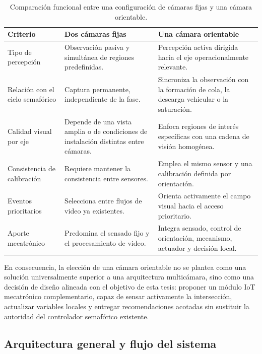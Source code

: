 \begin{table}[H]
  \centering
  \footnotesize
  \caption{Comparación funcional entre una configuración de cámaras fijas y una cámara orientable.}
  \label{tab:camara-orientable}
  \begin{tabularx}{\linewidth}{@{}>{\raggedright\arraybackslash}p{3.0cm}XX@{}}
    \toprule
    \textbf{Criterio} & \textbf{Dos cámaras fijas} & \textbf{Una cámara orientable}\\
    \midrule
    Tipo de percepción & Observación pasiva y simultánea de regiones predefinidas. & Percepción activa dirigida hacia el eje operacionalmente relevante.\\
    Relación con el ciclo semafórico & Captura permanente, independiente de la fase. & Sincroniza la observación con la formación de cola, la descarga vehicular o la saturación.\\
    Calidad visual por eje & Depende de una vista amplia o de condiciones de instalación distintas entre cámaras. & Enfoca regiones de interés específicas con una cadena de visión homogénea.\\
    Consistencia de calibración & Requiere mantener la consistencia entre sensores. & Emplea el mismo sensor y una calibración definida por orientación.\\
    Eventos prioritarios & Selecciona entre flujos de video ya existentes. & Orienta activamente el campo visual hacia el acceso prioritario.\\
    Aporte mecatrónico & Predomina el sensado fijo y el procesamiento de video. & Integra sensado, control de orientación, mecanismo, actuador y decisión local.\\
    \bottomrule
  \end{tabularx}
\end{table}

En consecuencia, la elección de una cámara orientable no se plantea como una solución universalmente superior a
una arquitectura multicámara, sino como una decisión de diseño alineada con el objetivo de esta tesis: proponer
un módulo IoT mecatrónico complementario, capaz de sensar activamente la intersección, actualizar variables
locales y entregar recomendaciones acotadas sin sustituir la autoridad del controlador semafórico existente.

\subsection{Arquitectura general y flujo del sistema}\label{sec:arquitectura-flujo}

